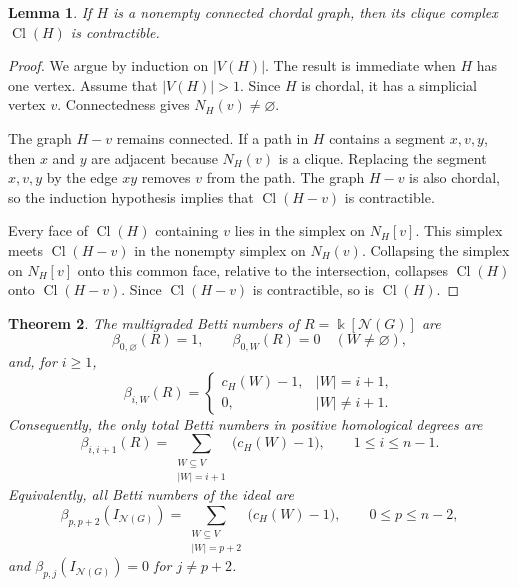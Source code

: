 \documentclass[11pt]{amsart}
\newtheorem{theorem}{Theorem}[section]
\newtheorem{lemma}[theorem]{Lemma}
\theoremstyle{definition}
\theoremstyle{remark}
\numberwithin{equation}{section}
\newcommand{\NN}{\mathcal N}
\newcommand{\Cl}{\operatorname{Cl}}
\begin{document}
	\begin{lemma}\label{lem:chordal-clique-contractible}
		If \(H\) is a nonempty connected chordal graph, then its clique complex
		\(\Cl(H)\) is contractible.
	\end{lemma}
	
	\begin{proof}
		We argue by induction on \(|V(H)|\). The result is immediate when \(H\) has
		one vertex. Assume that \(|V(H)|>1\). Since \(H\) is chordal, it has a simplicial vertex \(v\). Connectedness gives
		\(N_H(v)\ne\varnothing\).
		
		The graph \(H-v\) remains connected. If a path in \(H\) contains a
		segment \(x,v,y\), then \(x\) and \(y\) are adjacent because \(N_H(v)\) is a
		clique. Replacing the segment \(x,v,y\) by the edge \(xy\) removes \(v\)
		from the path. The graph \(H-v\) is also chordal, so the induction hypothesis
		implies that \(\Cl(H-v)\) is contractible.
		
		Every face of \(\Cl(H)\) containing \(v\) lies in the simplex on
		\(N_H[v]\). This simplex meets \(\Cl(H-v)\) in the nonempty simplex on
		\(N_H(v)\). Collapsing the simplex on \(N_H[v]\) onto this common face,
		relative to the intersection, collapses \(\Cl(H)\) onto \(\Cl(H-v)\).
		Since \(\Cl(H-v)\) is contractible, so is \(\Cl(H)\).
	\end{proof}

	\begin{theorem}\label{thm:all-betti}
		The multigraded Betti numbers of \(R=\Bbbk[\NN(G)]\) are
		\[
		\beta_{0,\varnothing}(R)=1,
		\qquad
		\beta_{0,W}(R)=0\quad(W\ne\varnothing),
		\]
		and, for \(i\ge1\),
		\begin{equation}\label{eq:multigraded}
			\beta_{i,W}(R)=
			\begin{cases}
				c_H(W)-1,& |W|=i+1,\\
				0,& |W|\ne i+1.
			\end{cases}
		\end{equation}
		Consequently, the only total Betti numbers in positive homological degrees are
		\begin{equation}\label{eq:component-total}
			\beta_{i,i+1}(R)=
			\sum_{\substack{W\subseteq V\\|W|=i+1}}
			\bigl(c_H(W)-1\bigr),\qquad 1\le i\le n-1.
		\end{equation}
		Equivalently, all Betti numbers of the ideal are
		\[
		\beta_{p,p+2}(I_{\NN(G)})
		=
		\sum_{\substack{W\subseteq V\\|W|=p+2}}
		\bigl(c_H(W)-1\bigr),\qquad 0\le p\le n-2,
		\]
		and \(\beta_{p,j}(I_{\NN(G)})=0\) for \(j\ne p+2\).
	\end{theorem}
	
\end{document}
